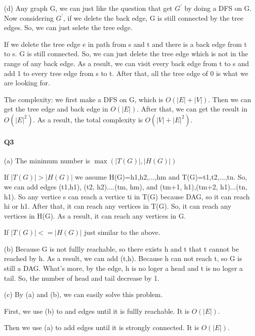 \documentclass[UTF8]{ctexart}
\renewcommand{\(}{\left(}
\renewcommand{\)}{\right)}
\begin{document}
(d) Any graph G, we can just like the question that get $G^{'}$ by doing a DFS on G. 
Now considering $G^{'}$, if we delete the back edge, G is still connected by the tree edges. 
So, we can just selete the tree edge.

If we delete the tree edge e in path from s and t and there is a back edge from t to s. 
G is still connected. So, we can just delete the tree edge which is not in the range of any back edge. 
As a result, we can visit every back edge from t to s and add 1 to every tree edge from s to t. 
After that, all the tree edge of 0 is what we are looking for. 

The complexity: we first make a DFS on G, which is $O\({\left| E\right|+\left| V\right|}\)$. 
Then we can get the tree edge and back edge in $O\({\left| E\right|}\)$.
After that, we can get the result in $O\({\left| E\right|^{2}}\)$.
As a result, the total complexity is $O\({\left| V \right| + \left| E\right|^{2}}\)$.

\paragraph{Q3}

(a) The minimum number is $\max (\left| T(G) \right|, \left| H(G) \right|)$

If $\left|T(G)\right|>\left|H(G)\right|$ we assume H(G)={h1,h2,...,hm} and T(G)={t1,t2,...,tn}. 
So, we can add edges (t1,h1), (t2, h2)....(tm, hm), and (tm+1, h1),(tm+2, h1)...(tn, h1).
So any vertice s can reach a vertice ti in T(G) because DAG, so it can reach hi or h1. 
After that, it can reach any vertices in T(G). So, it can reach any vertices in H(G).
As a result, it can reach any vertices in G.

If $\left|T(G)\right|<=\left|H(G)\right|$ just similar to the above.

(b) Because G is not fullly reachable, so there exists h and t that t cannot be reached by h.
As a result, we can add (t,h). Because h can not reach t, so G is still a DAG.
What's more, by the edge, h is no loger a head and t is no loger a tail. So, the number of head and tail decrease by 1.

(c) By (a) and (b), we can easily solve this problem. 

First, we use (b) to and edges until it is fullly reachable. It is $O\(\left| E \right|\) $.

Then we use (a) to add edges until it is strongly connected.  It is $O\(\left| E \right|\) $.
\end{document}

